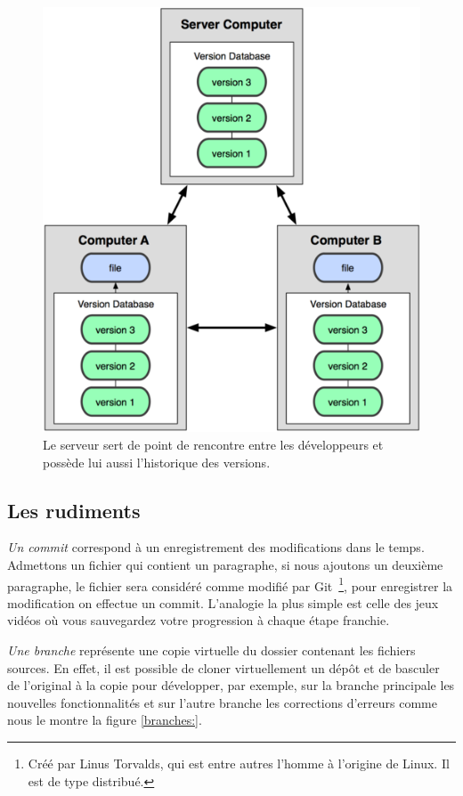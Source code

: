 \begin{figure}
\begin{center}
\includegraphics[scale=0.8]{images/workflow.png}
\caption{Le serveur sert de point de rencontre entre les développeurs et possède
lui aussi l’historique des versions.}
\label{workflow:}
\end{center}
\end{figure}

\subsection{Les rudiments}

\emph{Un commit} correspond à un enregistrement des modifications dans le
temps. Admettons un fichier qui contient un paragraphe, si nous ajoutons un
deuxième paragraphe, le fichier sera considéré comme modifié par Git\,
\footnote{Créé par Linus Torvalds, qui est entre autres l'homme à l'origine de
Linux. Il est de type distribué.}, pour enregistrer la modification on effectue
un commit. L'analogie la plus simple est celle des jeux vidéos où vous
sauvegardez votre progression à chaque étape franchie.

\emph{Une branche} représente une \og copie virtuelle \fg{} du dossier
contenant les fichiers sources. En effet, il est possible de cloner
virtuellement un dépôt et de basculer de l'original à la copie pour développer,
par exemple, sur la branche principale les nouvelles fonctionnalités et sur
l'autre branche les corrections d'erreurs comme nous le montre la figure
\ref{branches:}.

